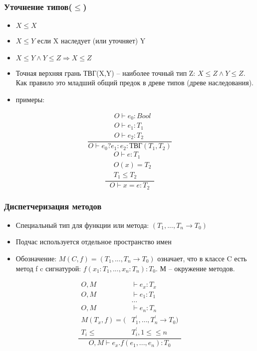 \documentclass[16pt,pdf,unicode]{beamer}
\begin{document}
\begin{frame}
  \frametitle{Уточнение типов($\leq$)}
\begin{itemize}
  \item $X\leq X$
  \item $X\leq Y$ если X наследует (или уточняет) Y
  \item $X\leq Y \land Y\leq Z \Rightarrow X\leq Z$
  \item Точная верхняя грань ТВГ(X,Y) -- наиболее точный тип Z: $X \leq Z \land Y \leq Z$. Как правило это младший общий предок в древе типов (древе наследования).
  \item примеры:
\end{itemize}
\begin{multicols}{2}
  \[\frac{\begin{aligned} &O\vdash e_0:Bool\\
      &O\vdash e_1:T_1\\
      &O\vdash e_2:T_2
  \end{aligned}}{O\vdash e_0 ? e_1 : e_2 :\text{ТВГ}(T_1,T_2)}\]
  \[\frac{\begin{aligned} &O\vdash e:T_1 \\ &O(x)=T_2 \\ &T_1 \leq T_2
  \end{aligned}}{O\vdash x=e:T_2}\]
\end{multicols}
\end{frame}

\begin{frame}
  \frametitle{Диспетчеризация методов}
\begin{itemize}
  \item Специальный тип для функции или метода: $(T_1,...,T_n\rightarrow T_0)$
  \item Подчас используется отдельное пространство имен
  \item Обозначение: $M(C,f)=(T_1,...,T_n\rightarrow T_0)$ означает, что в классе C есть метод f c сигнатурой: $f(x_1:T_1,...,x_n:T_n): T_0$. М -- окружение методов.
\end{itemize}
\[\frac{\begin{aligned}
    O,M&\vdash e_x:T_x\\
    O,M&\vdash e_1:T_1\\
    &\hdots\\
    O,M&\vdash e_n:T_n\\
    M(T_x,f)=(&T_1^{'},\hdots,T_n^{'}\rightarrow T_0)\\
    T_i\leq &T_i^{'}, 1\leq \leq n
  \end{aligned}}{O,M\vdash e_x.f(e_1,...,e_n):T_0}\]
\end{frame}
\end{document}
